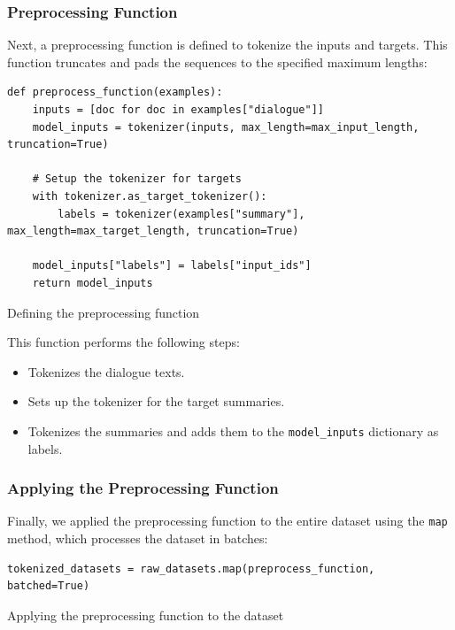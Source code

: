 \subsubsection{Preprocessing Function}

Next, a preprocessing function is defined to tokenize the inputs and targets. This function truncates and pads the sequences to the specified maximum lengths:

\begin{listing}[H]
\begin{verbatim}
def preprocess_function(examples):
    inputs = [doc for doc in examples["dialogue"]]
    model_inputs = tokenizer(inputs, max_length=max_input_length, truncation=True)

    # Setup the tokenizer for targets
    with tokenizer.as_target_tokenizer():
        labels = tokenizer(examples["summary"], max_length=max_target_length, truncation=True)

    model_inputs["labels"] = labels["input_ids"]
    return model_inputs
\end{verbatim}
\caption{Defining the preprocessing function}
\label{listing:Preprocess_Function}
\end{listing}

This function performs the following steps:
\begin{itemize}
    \item Tokenizes the dialogue texts.
    \item Sets up the tokenizer for the target summaries.
    \item Tokenizes the summaries and adds them to the \texttt{model\_inputs} dictionary as labels.
\end{itemize}

\subsubsection{Applying the Preprocessing Function}

Finally, we applied the preprocessing function to the entire dataset using the \texttt{map} method, which processes the dataset in batches:

\begin{listing}[H]
\begin{verbatim}
tokenized_datasets = raw_datasets.map(preprocess_function, batched=True)
\end{verbatim}
\caption{Applying the preprocessing function to the dataset}
\label{listing:Tokenized_Datasets}
\end{listing}


